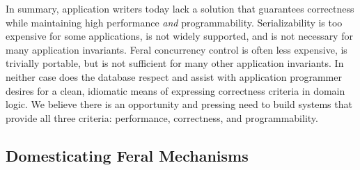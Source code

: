 In summary, application writers today lack a solution that guarantees
correctness while maintaining high performance \textit{and}
programmability. Serializability is too expensive for some
applications, is not widely supported, and is not necessary for many
application invariants. Feral concurrency control is often less
expensive, is trivially portable, but is not sufficient for many other
application invariants. In neither case does the database respect and
assist with application programmer desires for a clean, idiomatic
means of expressing correctness criteria in domain logic. We believe
there is an opportunity and pressing need to build systems that
provide all three criteria: performance, correctness, and
programmability.

\subsection{Domesticating Feral Mechanisms}

